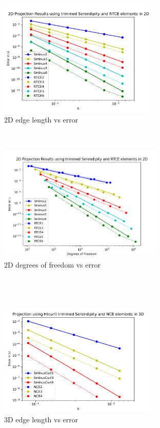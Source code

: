 \documentclass[manuscript,screen]{acmart}
\begin{document}
\begin{figure}[h!]
  \begin{subfigure}[h]{0.5\textwidth}
    \includegraphics[height=2.2in]{2dProjectionH.pdf}
    \caption{2D edge length vs error}
    \label{fig:2dProjectionH}
  \end{subfigure}
  ~
  \begin{subfigure}[h]{0.5\textwidth}
     \includegraphics[height=2.2in]{2dProjection.png}
     \caption{2D degrees of freedom vs error}
     \label{fig:2dProjection}
  \end{subfigure} \\
  ~
  \begin{subfigure}[h]{0.5\textwidth}
    \includegraphics[height=2.2in]{3dProjectionHError.pdf}
    \caption{3D edge length vs error}
    \label{fig:3dProjectionH}
  \end{subfigure}
  ~
  \begin{subfigure}[h]{0.5\textwidth}

\end{subfigure}
\end{figure}
\end{document}

